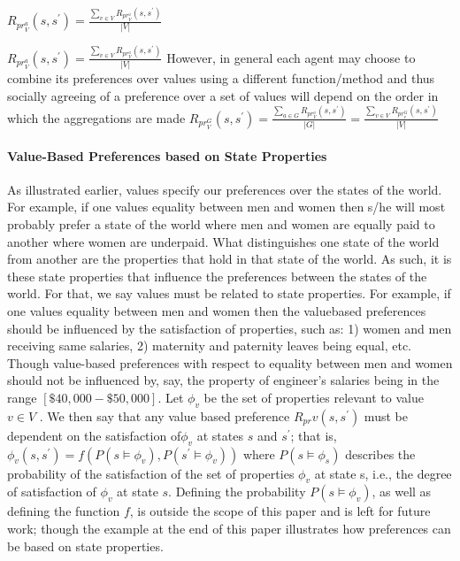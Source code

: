 \documentclass{article}
\theoremstyle{definition}
\theoremstyle{remark}
\begin{document}
$R_{pr}_{V}^{a}(s, s^\prime) = \frac{\sum_{v \in V} R_{pr}_{V}^{a}(s, s^\prime)}{|V|}$

$R_{pr}_{V}^{a}(s, s^\prime) = \frac{\sum_{v \in V} R_{pr}_{V}^{a}(s, s^\prime)}{|V|}$
However, in general each agent may choose to combine its preferences over
values using a different function/method and thus socially agreeing of a preference over a set of values will depend on the order in which the aggregations are
made
$R_{pr}_{V}^{G}(s, s^\prime) = \frac{\sum_{a \in G} R_{pr}_{V}^{a}(s, s^\prime)}{|G|} = \frac{\sum_{v \in V} R_{pr}_{v}^{G}(s, s^\prime)}{|V|}$

\paragraph{Value-Based Preferences based on State Properties}
As illustrated earlier, values specify our preferences over the states of the world.
For example, if one values equality between men and women then s/he will most
probably prefer a state of the world where men and women are equally paid to
another where women are underpaid.
What distinguishes one state of the world from another are the properties
that hold in that state of the world. As such, it is these state properties that
influence the preferences between the states of the world. For that, we say values
must be related to state properties.
For example, if one values equality between men and women then the valuebased preferences should be influenced by the satisfaction of properties, such as:
1) women and men receiving same salaries, 2) maternity and paternity leaves being equal, etc. Though value-based preferences with respect to equality between
men and women should not be influenced by, say, the property of engineer’s
salaries being in the range $[\$40,000 - \$50,000]$.
Let $\phi_{v}$ be the set of properties relevant to value $v \in V$ . We then say that
any value based preference $R_{pr} v(s, s^\prime)$  must be dependent on the satisfaction of$\phi_{v}$ at states $s$ and $s^\prime$; that is,
$\phi_{v} (s, s^\prime) = f(P(s \models \phi_{v}), P(s^\prime \models \phi_{v}))$ where $P(s \models \phi_{s})$ describes the probability of the satisfaction of the set of properties $\phi_{v}$ at state s, i.e., the degree of satisfaction of $\phi_{v}$ at state $s$.
Defining the probability $P(s \models \phi_{v})$, as well as defining the function $f$, is outside the scope of this paper and is left for future work; though the example at the end of this paper illustrates how preferences can be based on state properties.
\end{document}

